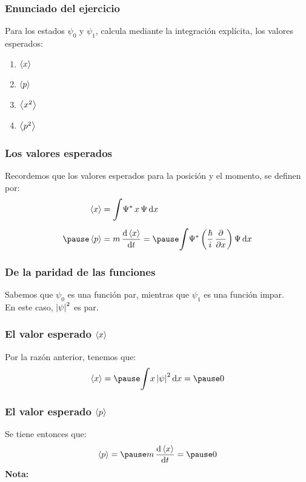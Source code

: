 \documentclass[12pt]{beamer}
\begin{document}
\begin{frame}
\frametitle{Enunciado del ejercicio}
Para los estados $\psi_{0}$ y $\psi_{1}$, calcula mediante la integración explícita, los valores esperados:
\pause
{}
\begin{enumerate}[<+->]
\item $\expval{x}$
\item $\expval{p}$
\item $\expval{x^{2}}$
\item $\expval{p^{2}}$
\end{enumerate}
\end{frame}
\begin{frame}
\frametitle{Los valores esperados}
Recordemos que los valores esperados para la posición y el momento, se definen por:
\pause
\begin{eqnarray*}
\begin{aligned}
\expval{x} &= \scaleint{6ex} \Psi^{*} \, x \, \Psi \dd{x} \\[0.5em] \pause
\expval{p} &= m \, \dv{\expval{x}}{t} = \pause \scaleint{6ex} \Psi^{*} \, \bigg( \dfrac{\hbar}{i} \, \pdv{x} \bigg) \, \Psi \dd{x}
\end{aligned}
\end{eqnarray*}
\end{frame}
\begin{frame}
\frametitle{De la paridad de las funciones}
Sabemos que $\psi_{0}$ es una función par, \pause mientras que $\psi_{1}$ es una función impar.
\\
\bigskip
\pause
En este caso, \pause $\abs{\psi}^{2}$ es par.
\end{frame}
\begin{frame}
\frametitle{El valor esperado $\expval{x}$}
Por la razón anterior, tenemos que:
\pause
\begin{eqnarray*}
\expval{x} = \pause \scaleint{6ex} x \, \abs{\psi}^{2} \dd{x} = \pause 0
\end{eqnarray*}
\end{frame}
\begin{frame}
\frametitle{El valor esperado $\expval{p}$}
Se tiene entonces que:
\pause
\begin{eqnarray*}
\expval{p} = \pause m \, \dv{\expval{x}}{t} = \pause 0
\end{eqnarray*}
\pause
\textbf{Nota: } 
\end{frame}
\end{document}
